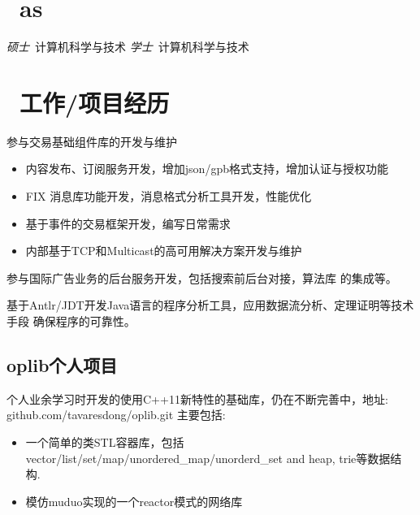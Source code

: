\documentclass{resume}
\begin{document}



\section{\faGraduationCap\ as}
\textit{硕士}\ 计算机科学与技术
\textit{学士}\ 计算机科学与技术

\section{\faUsers\ 工作/项目经历}

参与交易基础组件库的开发与维护
\begin{itemize}
  \item 内容发布、订阅服务开发，增加json/gpb格式支持，增加认证与授权功能
  \item FIX 消息库功能开发，消息格式分析工具开发，性能优化
  \item 基于事件的交易框架开发，编写日常需求
  \item 内部基于TCP和Multicast的高可用解决方案开发与维护
\end{itemize}


参与国际广告业务的后台服务开发，包括搜索前后台对接，算法库
的集成等。


基于Antlr/JDT开发Java语言的程序分析工具，应用数据流分析、定理证明等技术手段
确保程序的可靠性。

\subsection{\textbf{oplib个人项目}}
个人业余学习时开发的使用C++11新特性的基础库，仍在不断完善中，地址:
github.com/tavaresdong/oplib.git
主要包括:
\begin{itemize}
  \item 一个简单的类STL容器库，包括 vector/list/set/map/unordered\_map/unorderd\_set and heap, trie等数据结构.
  \item 模仿muduo实现的一个reactor模式的网络库
\end{itemize}
\end{document}
